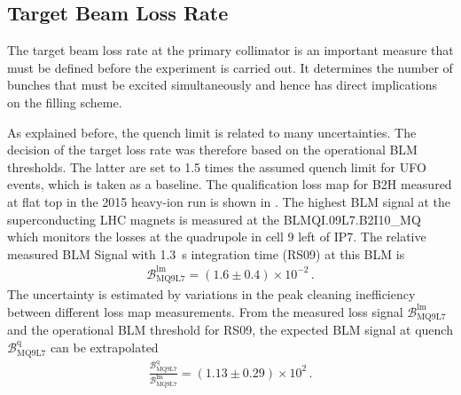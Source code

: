 \newpage
\subsection{Target Beam Loss Rate} \label{chap:targetlr}
 
The target beam loss rate at the primary collimator is an important measure that must be defined before the experiment is carried out. It determines the number of bunches that must be excited simultaneously and hence has direct implications on the filling scheme. 

As explained before, the quench limit is related to many uncertainties. The decision of the target loss rate was therefore based on the operational BLM thresholds. The latter are set to 1.5 times the assumed quench limit for UFO events, which is taken as a baseline. The qualification loss map for B2H measured at flat top in the 2015 heavy-ion run is shown in . The highest BLM signal at the superconducting LHC magnets is measured at the BLMQI.09L7.B2I10\_MQ which monitors the losses at the quadrupole in cell 9 left of IP7. The relative measured BLM Signal with 1.3~s integration time (RS09) at this BLM is 
%
\begin{align}
\mathcal{B}_\text{MQ9L7}^\text{lm} = (1.6 \pm 0.4) \times 10^{-2} \, . 
\end{align}
%
The uncertainty is estimated by variations in the peak cleaning inefficiency between different loss map measurements. From the measured loss signal $\mathcal{B}_\text{MQ9L7}^\text{lm}$ and the operational BLM threshold for RS09, the expected BLM signal at quench $\mathcal{B}_\text{MQ9L7}^\text{q}$ can be extrapolated 
%
\begin{align}
    \frac{\mathcal{B}_\text{MQ9L7}^\text{q}}{\mathcal{B}_\text{MQ9L7}^\text{lm}} =   (1.13 \pm 0.29) \times 10^{2} \, . \label{qtscl}
\end{align}

